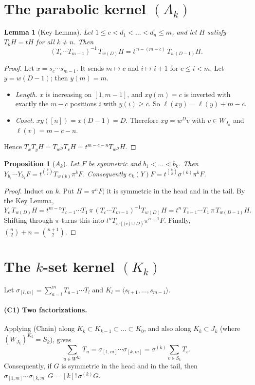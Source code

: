 \documentclass[11pt]{amsart}
\newtheorem{lemma}[theorem]{Lemma}
\newtheorem{proposition}[theorem]{Proposition}
\theoremstyle{remark}
\begin{document}
\section{The parabolic kernel $(A_k)$}

\begin{lemma}[Key Lemma]
Let $1\le c<d_1<\dots<d_n\le m$, and let $H$ satisfy $T_kH=tH$ for all $k\neq n$. Then
\[
(T_c\cdots T_{m-1})^{-1}\,T_{w(D)}H=t^{\,n-(m-c)}\,T_{w(D-1)}H.
\]
\end{lemma}

\begin{proof}
Let $x=s_c\cdots s_{m-1}$. It sends $m\mapsto c$ and $i\mapsto i+1$ for $c\le i<m$. Let $y=w(D-1)$; then $y(m)=m$.
\begin{itemize}
\item \emph{Length.} $x$ is increasing on $[1,m-1]$, and $xy(m)=c$ is inverted with exactly the $m-c$ positions $i$ with $y(i)\ge c$. So $\ell(xy)=\ell(y)+m-c$.
\item \emph{Coset.} $xy([n])=x(D-1)=D$. Therefore $xy=w^Dv$ with $v\in W_{J_n}$ and $\ell(v)=m-c-n$.
\end{itemize}
Hence $T_xT_yH=T_{w^D}T_vH=t^{m-c-n}T_{w^D}H$.
\end{proof}

\begin{proposition}[$A_k$]
Let $F$ be symmetric and $b_1<\dots<b_k$. Then $Y_{b_1}\cdots Y_{b_k}F=t^{\binom k2}T_{w(b)}\pi^kF$. Consequently $e_k(Y)F=t^{\binom k2}\sigma^{(k)}\pi^kF$.
\end{proposition}

\begin{proof}
Induct on $k$. Put $H=\pi^nF$; it is symmetric in the head and in the tail. By the Key Lemma,
\[
Y_c\,T_{w(D)}H=t^{m-c}T_{c-1}\cdots T_1\,\pi\,(T_c\cdots T_{m-1})^{-1}T_{w(D)}H=t^{n}\,T_{c-1}\cdots T_1\,\pi\,T_{w(D-1)}H .
\]
Shifting through $\pi$ turns this into $t^nT_{w(\{c\}\cup D)}\pi^{n+1}F$. Finally, $\binom n2+n=\binom{n+1}2$.
\end{proof}

\section{The $k$-set kernel $(K_k)$}

Let $\sigma_{[l,m]}=\sum_{a=l}^mT_{a-1}\cdots T_l$ and $K_l=\langle s_{l+1},\dots,s_{m-1}\rangle$.

\paragraph{(C1) Two factorizations.} Applying (Chain) along $K_k\subset K_{k-1}\subset\dots\subset K_0$, and also along $K_k\subset J_k$ (where $(W_{J_k})^{K_k}=S_k$), gives
\[
\sum_{u\in W^{K_k}}T_u=\sigma_{[1,m]}\cdots\sigma_{[k,m]}=\sigma^{(k)}\sum_{v\in S_k}T_v .
\]
Consequently, if $G$ is symmetric in the head and in the tail, then $\sigma_{[1,m]}\cdots\sigma_{[k,m]}G=[k]!\,\sigma^{(k)}G$.
\end{document}
